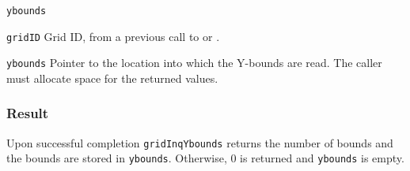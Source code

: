 \hspace*{4mm}\begin{minipage}[]{15cm}
\begin{deflist}{\texttt{ybounds}\ }
\item[\texttt{gridID}]
Grid ID, from a previous call to {} or {}.
\item[\texttt{ybounds}]
Pointer to the location into which the Y-bounds are read.
                    The caller must allocate space for the returned values.

\end{deflist}
\end{minipage}

\subsubsection*{Result}

Upon successful completion {\texttt{gridInqYbounds}} returns the number of bounds and
the bounds are stored in {\texttt{ybounds}}.
Otherwise, 0 is returned and {\texttt{ybounds}} is empty.


